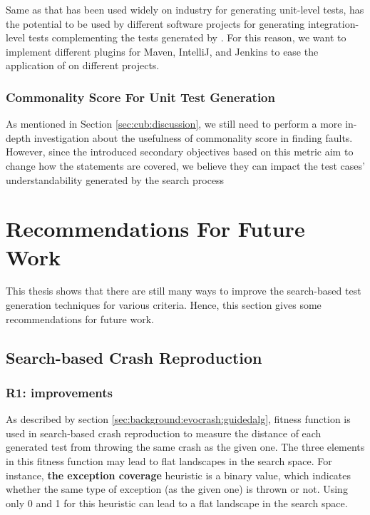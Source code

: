 Same as \evosuite that has been used widely on industry \cite{almasi2017industrial} for generating unit-level tests, \cling has the potential to be used by different software projects for generating integration-level tests complementing the tests generated by \evosuite. For this reason, we want to implement different plugins for Maven, IntelliJ, and Jenkins to ease the application of \cling on different projects.

\subsubsection{Commonality Score For Unit Test Generation}
As mentioned in Section \ref{sec:cub:discussion}, we still need to perform a more in-depth investigation about the usefulness of commonality score in finding faults. However, since the introduced secondary objectives based on this metric aim to change how the statements are covered, we believe they can impact the test cases' understandability generated by the search process


\section{Recommendations For Future Work}
This thesis shows that there are still many ways to improve the search-based test generation techniques for various criteria. Hence, this section gives some recommendations for future work.
\subsection{Search-based Crash Reproduction}

\subsubsection{R1: \CrashFunction improvements}
As described by section \ref{sec:background:evocrash:guidedalg}, \CrashFunction fitness function is used in search-based crash reproduction to measure the distance of each generated test from throwing the same crash as the given one. The three elements in this fitness function may lead to flat landscapes in the search space. For instance, \textbf{the exception coverage} heuristic is a binary value, which indicates whether the same type of exception (as the given one) is thrown or not. Using only 0 and 1 for this heuristic can lead to a flat landscape in the search space.


